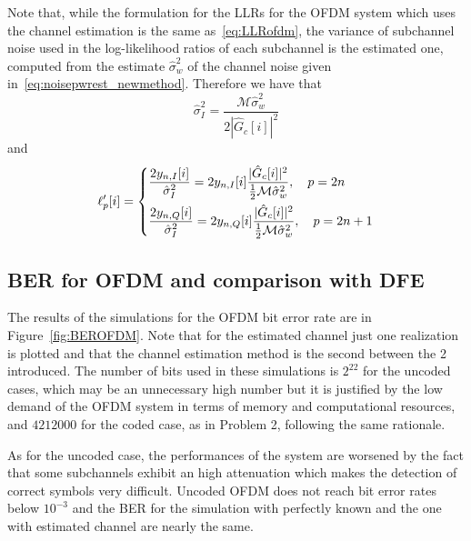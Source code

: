 \documentclass[10pt]{article}
\newcommand{\ofdM} {\mathcal{M}}
\begin{document}
Note that, while the formulation for the LLRs for the OFDM system which uses the channel estimation is the same as~\eqref{eq:LLRofdm}, the variance of subchannel noise used in the log-likelihood ratios of each subchannel is the estimated one, computed from the estimate $\hat{\sigma}_w^2$ of the channel noise given in~\eqref{eq:noisepwrest_newmethod}. Therefore we have that 
\begin{equation}
	\hat{\sigma}_I^2  = \frac{\ofdM \hat{\sigma}_w^2}{2 |\hat{G}_c[i]|^2}
\end{equation}
and
\begin{equation}
\ell'_p[i] =
	\begin{dcases}
	\frac{2 y_{n,I}[i]}{\hat{\sigma}_I^2} = 2 y_{n,I}[i] \frac{|\hat{G}_c[i]|^2 }{\frac{1}{2} \ofdM \hat{\sigma}_w^2}, \quad p = 2n \\
	\frac{2 y_{n,Q}[i]}{\hat{\sigma}_I^2} = 2 y_{n,Q}[i] \frac{|\hat{G}_c[i]|^2 }{\frac{1}{2} \ofdM \hat{\sigma}_w^2}, \quad p = 2n+1 \\
	\end{dcases}
\end{equation}


\subsection*{BER for OFDM and comparison with DFE}
The results of the simulations for the OFDM bit error rate are in Figure~\ref{fig:BEROFDM}. Note that for the estimated channel just one realization is plotted and that the channel estimation method is the second between the 2 introduced. The number of bits used in these simulations is $2^{22}$ for the uncoded cases, which may be an unnecessary high number but it is justified by the low demand of the OFDM system in terms of memory and computational resources, and $4212000$ for the coded case, as in Problem 2, following the same rationale.

As for the uncoded case, the performances of the system are worsened by the fact that some subchannels exhibit an high attenuation which makes the detection of correct symbols very difficult. Uncoded OFDM does not reach bit error rates below $10^{-3}$ and the BER for the simulation with perfectly known and the one with estimated channel are nearly the same. 
\end{document}
